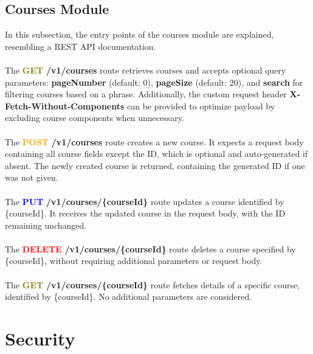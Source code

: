 \subsection{Courses Module}

In this subsection, the entry points of the courses module are explained, resembling a REST API documentation.
\\\\
\noindent The \textcolor{olive}{\textbf{GET}} \textbf{/v1/courses} route retrieves courses and accepts optional query parameters: \textbf{pageNumber} (default: 0), \textbf{pageSize} (default: 20), and \textbf{search} for filtering courses based on a phrase. Additionally, the custom request header \textbf{X-Fetch-Without-Components} can be provided to optimize payload by excluding course components when unnecessary.
\\\\
\noindent The \textcolor{orange}{\textbf{POST}} \textbf{/v1/courses} route creates a new course. It expects a request body containing all course fields except the ID, which is optional and auto-generated if absent. The newly created course is returned, containing the generated ID if one was not given.
\\\\
\noindent The \textcolor{blue}{\textbf{PUT}} \textbf{/v1/courses/\{courseId\}} route updates a course identified by \{courseId\}. It receives the updated course in the request body, with the ID remaining unchanged.
\\\\
\noindent The \textcolor{red}{\textbf{DELETE}} \textbf{/v1/courses/\{courseId\}} route deletes a course specified by \{courseId\}, without requiring additional parameters or request body.
\\\\
\noindent The \textcolor{olive}{\textbf{GET}} \textbf{/v1/courses/\{courseId\}} route fetches details of a specific course, identified by \{courseId\}. No additional parameters are considered.

\section{Security}

